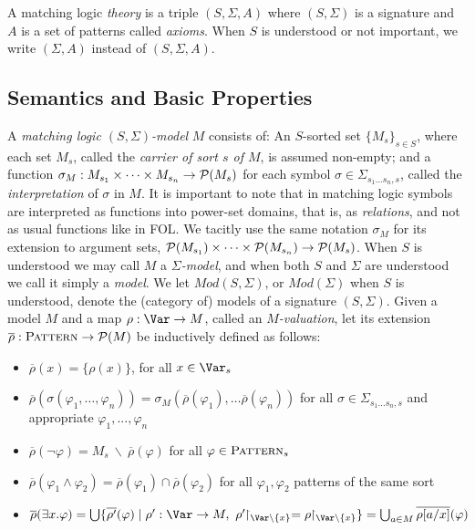 \documentclass[UTF8,11pt]{article}
\theoremstyle{plain}
\theoremstyle{definition}
\theoremstyle{remark}
\newcommand{\Mod}{\textit{Mod}}
\newcommand{\Pattern}{\textsc{Pattern}\xspace}
\begin{document}
A matching logic \emph{theory} is a triple $(S, \Sigma, A)$ where
$(S,\Sigma)$ is a signature and $A$ is a set of patterns called \emph{axioms}.
When $S$ is understood or not important, we write $(\Sigma,A)$ instead of $(S,\Sigma,A)$.

\subsection{Semantics and Basic Properties}
\label{sec:semantics}

A \emph{matching logic $(S,\Sigma)$-model} $M$ consists of:
An $S$-sorted set $\{M_s\}_{s\in S}$, where each set $M_s$,
called the \emph{carrier of sort $s$ of $M$}, is assumed
non-empty; and a function
$\sigma_M:M_{s_1}\times\cdots\times M_{s_n} \rightarrow {\cal P}(M_s)$
for each symbol $\sigma\in\Sigma_{s_1\ldots s_n,s}$, called the
\emph{interpretation} of $\sigma$ in $M$.
It is important to note that in matching logic symbols are interpreted as
functions into power-set domains, that is, as \emph{relations}, and not as
usual functions like in FOL.
We tacitly use the same notation $\sigma_M$ for its extension
to argument sets,
${\cal P}(M_{s_1})\times\cdots\times {\cal P}(M_{s_n}) \rightarrow {\cal P}(M_s)$.
When $S$ is understood we may call $M$ a \emph{$\Sigma$-model}, and when
both $S$ and $\Sigma$ are understood we call it simply a \emph{model}.
We let $\Mod(S,\Sigma)$, or $\Mod(\Sigma)$ when $S$ is understood, denote
the (category of) models of a signature $(S,\Sigma)$.
%
Given a model $M$ and a map
$\rho:\Var\rightarrow M$, called an \emph{$M$-valuation}, let its extension
$\overline{\rho}:\Pattern\rightarrow{\cal P}(M)$
be inductively defined as follows:\vspace*{-2ex}
\begin{itemize}\itemsep-1ex
\item $\overline{\rho}(x) = \{\rho(x)\}$, for all $x\in\Var_s$
\item $\overline{\rho}(\sigma(\varphi_{1},\ldots,\varphi_{n}))=
\sigma_M(\overline{\rho}(\varphi_1),\ldots \overline{\rho}(\varphi_n))$ for all
$\sigma\in\Sigma_{s_1...s_n,s}$ and appropriate $\varphi_1,...,\varphi_n$
\item $\overline{\rho}(\neg\varphi) = M_s \ \backslash\ \overline{\rho}(\varphi)$ for all
$\varphi\in\Pattern_s$
\item $\overline{\rho}(\varphi_1 \wedge \varphi_2) =
\overline{\rho}(\varphi_1) \cap \overline{\rho}(\varphi_2)$
for all $\varphi_1, \varphi_2$ patterns of the same sort
\item $\overline{\rho}(\exists x . \varphi) =
\bigcup\{\overline{\rho'}(\varphi) \mid \rho':\Var\rightarrow M,\ 
\rho'\!\!\upharpoonright_{\Var\backslash\{x\}} =
\rho\!\!\upharpoonright_{\Var\backslash\{x\}}\}
= \bigcup_{a\in M} \overline{\rho[a/x]}(\varphi)
$
\end{itemize}\vspace*{-.5ex}
\end{document}
